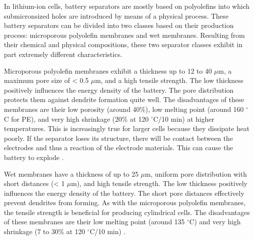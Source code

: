 In lithium-ion cells, battery separators are mostly based on polyolefins into which submicronsized holes are introduced by means of a physical process. These battery separators can be divided into two classes based on their production process: microporous polyolefin membranes and wet membranes.
Resulting from their chemical and physical compositions, these two separator classes exhibit in part extremely different characteristics.

Microporous polyolefin membranes exhibit a thickness up to 12 to 40 $\mu$m, a maximum pore size of < 0.5 $\mu$m, and a high tensile strength. The low thickness positively influences the energy density of the battery. The pore distribution protects them against dendrite formation quite well. The disadvantages of these membranes are their low porosity (around 40\%), low melting point (around 160 $^\circ$C for PE), and very high shrinkage (20\% at 120 $^\circ$C/10 min) at higher temperatures. This is increasingly true for larger cells because they dissipate heat poorly. If the separator loses its structure, there will be contact between the electrodes and thus a reaction of the electrode materials. This can cause the battery to explode \cite{korthauer2018lithium}.

Wet membranes have a thickness of up to 25 $\mu$m, uniform pore distribution with short distances (< 1 $\mu$m), and high tensile strength. The low thickness positively influences the energy density of the battery. The short pore distances effectively prevent dendrites from forming. As with the microporous polyolefin membranes, the tensile strength is beneficial for producing cylindrical cells. The disadvantages of these membranes are their low melting point (around 135 $^\circ$C) and very high shrinkage (7 to 30\% at 120 $^\circ$C/10 min) \cite{arora2004battery,bladwin2009review}.

